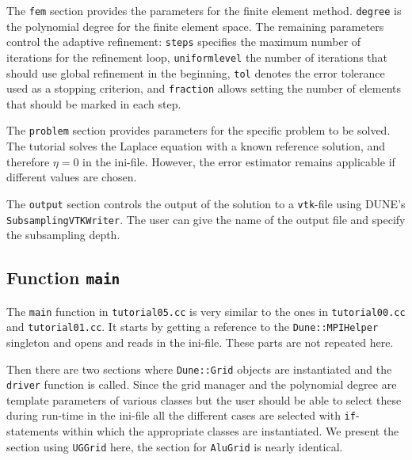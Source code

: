 \documentclass[a4paper,12pt]{article}
\begin{document}

The \lstinline{fem} section provides the parameters for the finite element method.
\lstinline{degree} is the polynomial degree for the finite element space. The remaining
parameters control the adaptive refinement: \lstinline{steps} specifies the maximum number of
iterations for the refinement loop, \lstinline{uniformlevel} the number of iterations that
should use global refinement in the beginning, \lstinline{tol} denotes the error tolerance
used as a stopping criterion, and \lstinline{fraction} allows setting the number of elements that
should be marked in each step.


The \lstinline{problem} section provides parameters for the specific problem to be solved. The
tutorial solves the Laplace equation with a known reference solution, and therefore $\eta = 0$ in
the ini-file. However, the error estimator remains applicable if different values are chosen.


The \lstinline{output} section controls the output of the solution
to a \lstinline{vtk}-file using DUNE's \lstinline{SubsamplingVTKWriter}.
The user can give the name of the output file and specify the subsampling depth.

\subsection{Function \lstinline{main}}

The \lstinline{main} function  in \lstinline{tutorial05.cc} is very similar to the ones
in \lstinline{tutorial00.cc} and \lstinline{tutorial01.cc}. It starts by getting a reference
to the \lstinline{Dune::MPIHelper} singleton and opens and reads in the ini-file.
These parts are not repeated here.

Then there are two sections where \lstinline{Dune::Grid} objects are instantiated
and the \lstinline{driver} function is called. Since the grid manager
and the polynomial degree are template parameters of various classes
but the user should be able to select these during run-time in the ini-file all
the different cases are selected with \lstinline{if}-statements within which
the appropriate classes are instantiated. We present the section using
\lstinline{UGGrid} here, the section for \lstinline{AluGrid} is nearly identical.
\end{document}
